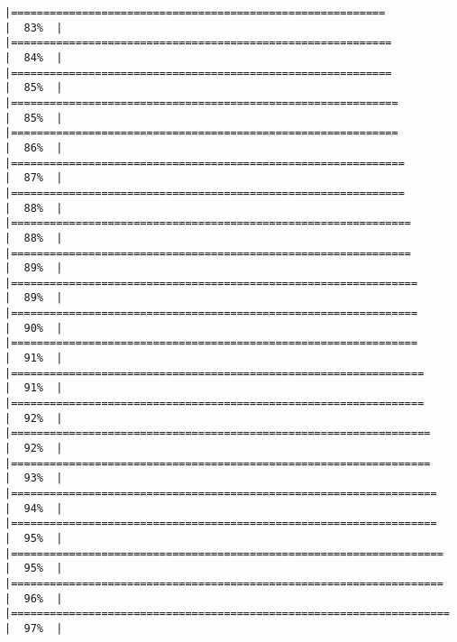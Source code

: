 \documentclass[
]{book}
\begin{document}
\begin{verbatim}
|==========================================================            |  83%  |                                                                              |===========================================================           |  84%  |                                                                              |===========================================================           |  85%  |                                                                              |============================================================          |  85%  |                                                                              |============================================================          |  86%  |                                                                              |=============================================================         |  87%  |                                                                              |=============================================================         |  88%  |                                                                              |==============================================================        |  88%  |                                                                              |==============================================================        |  89%  |                                                                              |===============================================================       |  89%  |                                                                              |===============================================================       |  90%  |                                                                              |===============================================================       |  91%  |                                                                              |================================================================      |  91%  |                                                                              |================================================================      |  92%  |                                                                              |=================================================================     |  92%  |                                                                              |=================================================================     |  93%  |                                                                              |==================================================================    |  94%  |                                                                              |==================================================================    |  95%  |                                                                              |===================================================================   |  95%  |                                                                              |===================================================================   |  96%  |                                                                              |====================================================================  |  97%  |                                                                              
\end{verbatim}
\end{document}
